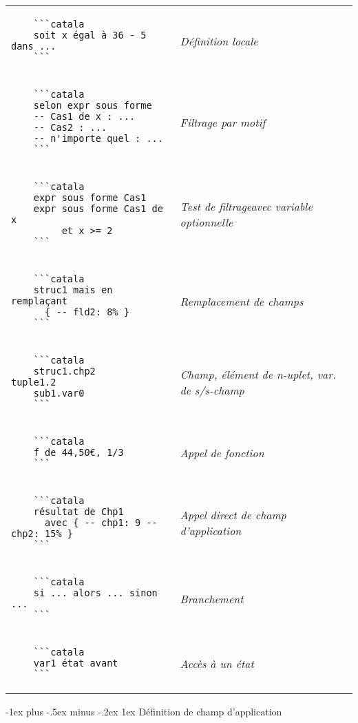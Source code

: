\documentclass{article}
\makeatletter
\newcommand\articlenormalsize{\fontsize{10pt}{12pt}\selectfont}
\renewcommand{\section}{\@startsection{section}{1}{0mm}%
                                {-1ex plus -.5ex minus -.2ex}%
                                {1ex}%
                                {\normalfont\articlenormalsize\bfseries}}
\newenvironment{catala}{%
  \VerbatimEnvironment
  \let\FV@ListVSpace\relax
  \begin{verbatim}}%
 {\end{verbatim}}
\makeatother
\begin{document}
\begin{multicols}{3}
\begin{tabular}{@{}p{\cola}>{\slshape}p{\colb}@{}}
  \begin{catala}
    ```catala
    soit x égal à 36 - 5 dans ...
    ```
  \end{catala}
  & Définition locale
  \\
  \begin{catala}
    ```catala
    selon expr sous forme
    -- Cas1 de x : ...
    -- Cas2 : ...
    -- n'importe quel : ...
    ```
  \end{catala}
  & Filtrage par motif
  \\
  \begin{catala}
    ```catala
    expr sous forme Cas1
    expr sous forme Cas1 de x
         et x >= 2
    ```
  \end{catala}
  & Test de filtrage\newline avec variable optionnelle
  \\
  \begin{catala}
    ```catala
    struc1 mais en remplaçant
      { -- fld2: 8%
    ```
  \end{catala}
  & Remplacement de champs
  \\
  \begin{catala}
    ```catala
    struc1.chp2         tuple1.2
    sub1.var0
    ```
  \end{catala}
  & Champ, élément de n-uplet, var. de s/s-champ
  \\
  \begin{catala}
    ```catala
    f de 44,50€, 1/3
    ```
  \end{catala}
  & Appel de fonction
  \\
  \begin{catala}
    ```catala
    résultat de Chp1
      avec { -- chp1: 9 -- chp2: 15%
    ```
  \end{catala}
  & Appel direct de champ d'application
  \\
  \begin{catala}
    ```catala
    si ... alors ... sinon ...
    ```
  \end{catala}
  & Branchement
  \\
  \begin{catala}
    ```catala
    var1 état avant
    ```
  \end{catala}
  & Accès à un état
  \\
\end{tabular}

\columnbreak

\section{Définition de champ d'application}


\end{multicols}
\end{document}
